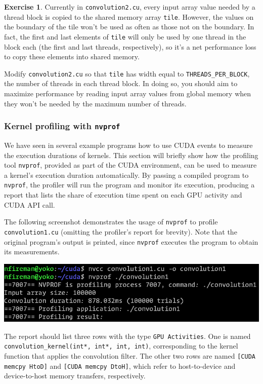 \documentclass{article}
\theoremstyle{definition}
\newtheorem{exercise}{Exercise}
\begin{document}
\begin{exercise}
Currently in \texttt{convolution2.cu}, every input array value needed by a thread block is copied to the shared memory array \texttt{tile}. However, the values on the boundary of the tile won't be used as often as those not on the boundary. In fact, the first and last elements of \texttt{tile} will only be used by one thread in the block each (the first and last threads, respectively), so it's a net performance loss to copy these elements into shared memory.

Modify \texttt{convolution2.cu} so that \texttt{tile} has width equal to \texttt{THREADS\_PER\_BLOCK}, the number of threads in each thread block. In doing so, you should aim to maximize performance by reading input array values from global memory when they won't be needed by the maximum number of threads.
\end{exercise}

\subsubsection*{Kernel profiling with \texttt{nvprof}}

We have seen in several example programs how to use CUDA events to measure the execution durations of kernels. This section will briefly show how the profiling tool \texttt{nvprof}, provided as part of the CUDA environment, can be used to measure a kernel's execution duration automatically. By passing a compiled program to \texttt{nvprof}, the profiler will run the program and monitor its execution, producing a report that lists the share of execution time spent on each GPU activity and CUDA API call.

The following screenshot demonstrates the usage of \texttt{nvprof} to profile \texttt{convolution1.cu} (omitting the profiler's report for brevity). Note that the original program's output is printed, since \texttt{nvprof} executes the program to obtain its measurements.

\includegraphics[width=\textwidth]{images/nvprof-output.png}

The report should list three rows with the type \texttt{GPU Activities}. One is named \texttt{convolution\_kernel(int*, int*, int, int)}, corresponding to the kernel function that applies the convolution filter. The other two rows are named \texttt{[CUDA memcpy HtoD]} and \texttt{[CUDA memcpy DtoH]}, which refer to host-to-device and device-to-host memory transfers, respectively.
\end{document}
